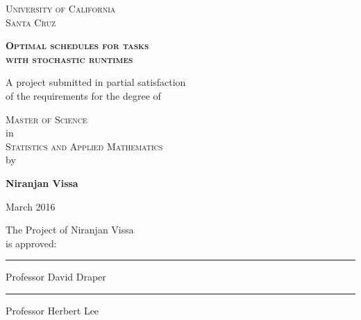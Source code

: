 \documentclass[12pt]{report}
\begin{document}
\begin{titlepage}
\begin{center}

\textsc{\Large University of California \\
Santa Cruz } \\
\vspace*{0.15in}

\textsc{\Large \textbf{Optimal schedules for tasks \\
with stochastic runtimes}}
\vspace*{0.15in}

\large
A project submitted in partial satisfaction \vspace*{-0.1in} \\
of the requirements for the degree of \\
\vspace*{0.15in}

\textsc{\Large Master of Science} \\
\large in \\

\textsc{\Large Statistics and Applied Mathematics} \\
\large by \\
\vspace*{0.15in}

\textbf{Niranjan Vissa} \\
\vspace*{0.15in}

March 2016
\large
\vspace*{0.15in}

\begin{flushright}

The Project of Niranjan Vissa \\
is approved:
\vspace*{-0.1in}
\vspace*{0.2in}

\rule{2.5in}{.01cm}

Professor David Draper

\vspace*{0.2in}

\rule{2.5in}{.01cm}

Professor Herbert Lee

\end{flushright}

\end{center}
\end{titlepage}


\end{document}
